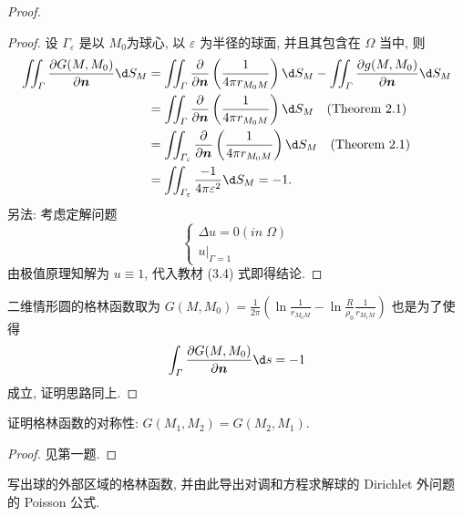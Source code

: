 \begin{proof}
  \begin{proof}
    设 $\varGamma_{\varepsilon}$ 是以 $M_0$为球心,
    以 $\varepsilon$ 为半径的球面, 并且其包含在 $\varOmega$ 当中, 则
    \[\begin{split}
      \iint_{\varGamma}\frac{\partial G(M,M_0)}{\partial\bm{n}}\d S_M
      & = \iint_{\varGamma}\frac{\partial}{\partial\bm{n}}\left(\frac{1}{4\pi r_{M_0M}}\right)\d S_M-\iint_{\varGamma}\frac{\partial g(M,M_0)}{\partial\bm{n}}\d S_M \\
      & = \iint_{\varGamma}\frac{\partial}{\partial\bm{n}}
          \left(\frac{1}{4\pi r_{M_0M}}\right)\d S_M\quad (\text{Theorem 2.1}) \\
      & = \iint_{\varGamma_{\varepsilon}}\frac{\partial}{\partial\bm{n}}
          \left(\frac{1}{4\pi r_{M_0M}}\right)\d S_M\quad (\text{Theorem 2.1}) \\
      & = \iint_{\varGamma_{\varepsilon}}\frac{-1}{4\pi\varepsilon^2}\d S_M = -1.
    \end{split}\]
    另法: 考虑定解问题
    \[\begin{cases}
      \Delta u=0(in\;\varOmega) \\
      u|_{\varGamma=1}
    \end{cases}\]
    由极值原理知解为 $u\equiv1$, 代入教材 (3.4) 式即得结论.
  \end{proof}

  二维情形圆的格林函数取为 $\displaystyle G(M,M_0)=\frac{1}{2\pi}\left(\ln\frac{1}{r_{M_0M}}-\ln\frac{R}{\rho_0}\frac{1}{r_{M_1M}}\right)$
  也是为了使得
  \[ \int_{\varGamma}\frac{\partial G(M,M_0)}{\partial\bm{n}}\d s = -1 \]
  成立, 证明思路同上.
\end{proof}


\begin{exercise}
  证明格林函数的对称性: $G(M_1,M_2) = G(M_2,M_1)$.
\end{exercise}

\begin{proof}
  见第一题.
\end{proof}


\begin{exercise}
  写出球的外部区域的格林函数, 并由此导出对调和方程求解球的 Dirichlet 外问题的 Poisson 公式.
\end{exercise}

